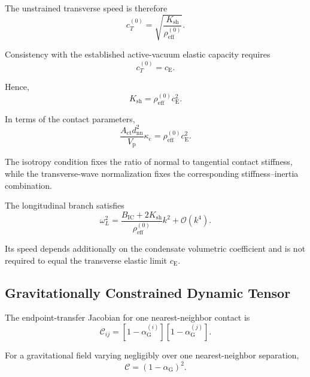 The unstrained transverse speed is therefore
\begin{equation}
    \boxed{ c_T^{(0)} = \sqrt{ \frac{ K_{\mathrm{sh}} }{ \rho_{\mathrm{eff}}^{(0)} } }. }
\end{equation}

Consistency with the established active-vacuum elastic capacity requires
\begin{equation}
    c_T^{(0)} = c_{\mathrm{E}}.
\end{equation}

Hence,
\begin{equation}
    \boxed{ K_{\mathrm{sh}} = \rho_{\mathrm{eff}}^{(0)} c_{\mathrm{E}}^2. }
\end{equation}

In terms of the contact parameters,
\begin{equation}
    \boxed{ \frac{ A_{\mathrm{ct}}d_{\mathrm{nn}}^2 }{ V_{\mathrm{p}} } \kappa_{\mathrm{c}} = \rho_{\mathrm{eff}}^{(0)} c_{\mathrm{E}}^2. }
\end{equation}

The isotropy condition fixes the ratio of normal to tangential contact stiffness, while the transverse-wave normalization fixes the corresponding stiffness--inertia combination.

The longitudinal branch satisfies
\begin{equation}
    \omega_L^2 = \frac{ B_{\mathrm{IC}} + 2K_{\mathrm{sh}} }{ \rho_{\mathrm{eff}}^{(0)} } k^2 + \mathcal{O}(k^4).
\end{equation}

Its speed depends additionally on the condensate volumetric coefficient and is not required to equal the transverse elastic limit $c_{\mathrm{E}}$.

\subsection{Gravitationally Constrained Dynamic Tensor}

The endpoint-transfer Jacobian for one nearest-neighbor contact is
\begin{equation}
    \mathcal{C}_{ij} = \left[ 1-\alpha_{\mathrm{G}}^{(i)} \right] \left[ 1-\alpha_{\mathrm{G}}^{(j)} \right].
\end{equation}

For a gravitational field varying negligibly over one nearest-neighbor separation,
\begin{equation}
    \mathcal{C} = \left( 1-\alpha_{\mathrm{G}} \right)^2.
\end{equation}

